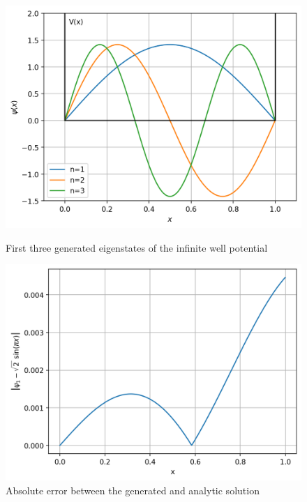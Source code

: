\documentclass[11pt]{article}
\begin{document}
\begin{figure}[htbp]
  \begin{minipage}{0.5\textwidth}
    \centering
    \includegraphics*[width=\linewidth]{ex_eigenstates1.png}
    \captionsetup{width=0.9\textwidth}
    \vspace{-.3cm}
    \caption{First three generated eigenstates of the infinite well potential}
    \label{fig:5}
  \end{minipage}%
  \begin{minipage}{0.5\textwidth}
    \centering
    \includegraphics*[width=\linewidth]{error_sin.png}
    \captionsetup{width=0.9\textwidth}
    \vspace{-.3cm}
    \caption{Absolute error between the generated and analytic solution}
    \label{fig:6}
  \end{minipage}
\end{figure}
\end{document}
